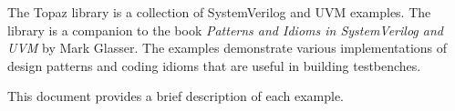 The Topaz library is a collection of SystemVerilog and UVM examples.
The library is a companion to the book \emph{Patterns and Idioms in
SystemVerilog and UVM} by Mark Glasser.  The examples demonstrate
various implementations of design patterns and coding idioms that are
useful in building testbenches.

This document provides a brief description of each example.

